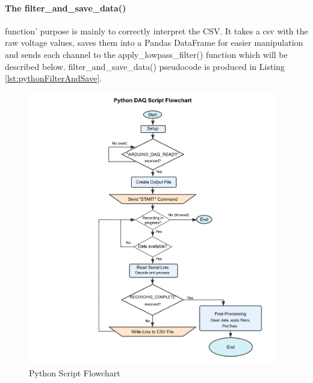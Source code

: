 \paragraph{The filter\_and\_save\_data()} function' purpose is mainly to correctly interpret the CSV. It takes a csv with the raw voltage values, saves them into a Pandas DataFrame for easier manipulation and sends each channel to the apply\_lowpass\_filter() function which will be described below. filter\_and\_save\_data() pseudocode is produced in Listing \ref{lst:pythonFilterAndSave}.

\begin{figure}[h] 
  \centering
  \includegraphics[width=0.97\textwidth]{chapters/methodology/ArduinoDAQ/python_serial_receive.jpg}
  \caption{Python Script Flowchart}
  \label{fig:pythonFlowchart}
\end{figure}


